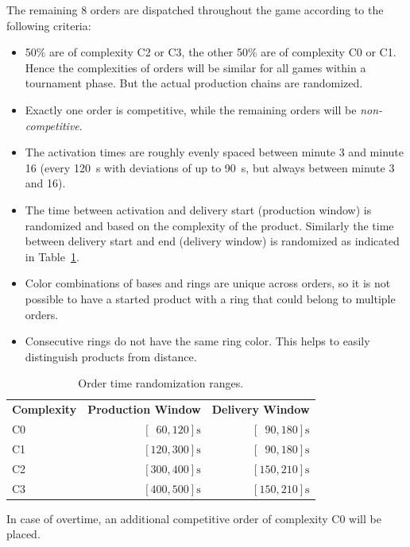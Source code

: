 \documentclass[12pt,twoside]{article}
\newcommand{\reftab}[1]{Table~\ref{#1}}
\begin{document}
The remaining 8 orders are dispatched throughout the game according to the
following criteria:
\begin{itemize}
  \item 50\% are of complexity C2 or C3, the other 50\% are of complexity C0 or
    C1.
    Hence the complexities of orders will be similar for all games within a
    tournament phase. But the actual production chains are randomized.
  \item Exactly one order is competitive, while the remaining orders will be
    \emph{non-competitive}.
  \item The activation times are roughly evenly spaced between minute 3 and
    minute 16 (every \SI{120}{\second} with deviations of up to
    \SI{90}{\second}, but always between minute 3 and 16).
  \item The time between activation and delivery start (production window) is
    randomized and based on the complexity of the product.
    Similarly the time between delivery start and end (delivery window)
    is randomized as indicated in \reftab{tab:order-time-randomization}.
  \item Color combinations of bases and rings are unique across orders, so it
    is not possible to have a started product with a ring that could belong to
    multiple orders.
  \item Consecutive rings do not have the same ring color. This helps to
    easily distinguish products from distance.
\end{itemize}
\begin{center}
\begin{table}
\begin{tabular}{l|r|r}
  \bf{Complexity} & \bf{Production Window} & \bf{Delivery Window} \\
  C0 & $[\phantom{1}60,120]\si{\second}$ & $[\phantom{1}90,180]\si{\second}$
  \\\hline
  C1 & $[120,300]\si{\second}$           & $[\phantom{1}90,180]\si{\second}$
  \\\hline
  C2 & $[300,400]\si{\second}$           & $[150,210]\si{\second}$\\\hline
  C3 & $[400,500]\si{\second}$           & $[150,210]\si{\second}$
\end{tabular}
\caption{Order time randomization ranges.}
\label{tab:order-time-randomization}
\end{table}
\end{center}

In case of overtime, an
additional competitive order of complexity C0 will be placed.
\end{document}
